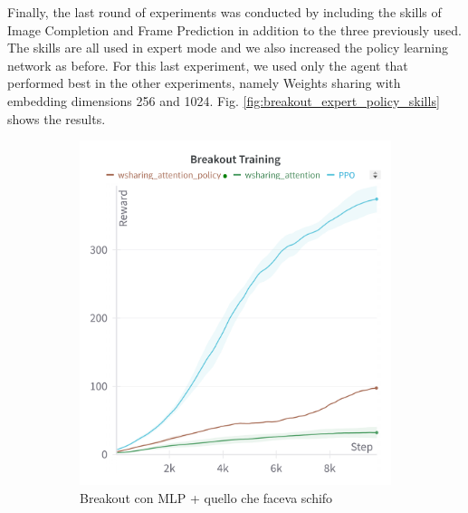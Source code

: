Finally, the last round of experiments was conducted by including the skills of Image Completion and Frame Prediction in addition to the three previously used. The skills are all used in expert mode and we also increased the policy learning network as before.
For this last experiment, we used only the agent that performed best in the other experiments, namely Weights sharing with embedding dimensions 256 and 1024.
Fig. \ref{fig:breakout_expert_policy_skills} shows the results.

\begin{figure}[htbp]
    \centering
    \begin{subfigure}[b]{0.32\textwidth}
        \centering
        \includegraphics[width=\textwidth]{images/breakout_policy.png}
        \caption{Breakout con MLP + quello che faceva schifo}
        \label{fig:breakout_expert}
    \end{subfigure}
    \hfill
    \begin{subfigure}[b]{0.32\textwidth}
        \centering

\end{subfigure}
\end{figure}
